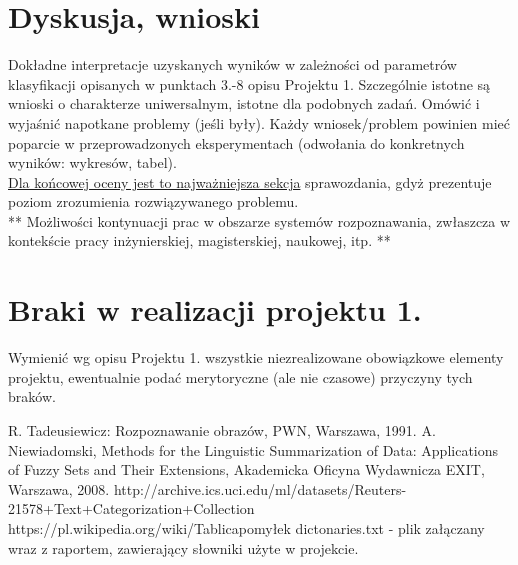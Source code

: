 \documentclass{classrep}
\begin{document}
\section{Dyskusja, wnioski}
Dokładne interpretacje uzyskanych wyników w zależności od parametrów klasyfikacji
opisanych w punktach 3.-8 opisu Projektu 1. 
Szczególnie istotne są wnioski o charakterze uniwersalnym, istotne dla podobnych zadań. 
Omówić i wyjaśnić napotkane problemy (jeśli były). Każdy wniosek/problem powinien mieć poparcie
w przeprowadzonych eksperymentach (odwołania do konkretnych wyników: wykresów,
tabel). \\
\underline{Dla końcowej oceny jest to najważniejsza sekcja} sprawozdania, gdyż prezentuje poziom
zrozumienia rozwiązywanego problemu.\\

** Możliwości kontynuacji prac w obszarze systemów rozpoznawania, zwłaszcza w kontekście pracy inżynierskiej,
magisterskiej, naukowej, itp. **\\



\section{Braki w realizacji projektu 1.}
Wymienić wg opisu Projektu 1. wszystkie niezrealizowane obowiązkowe elementy projektu, ewentualnie
podać merytoryczne (ale nie czasowe) przyczyny tych braków. 


\begin{thebibliography}{0}
 R. Tadeusiewicz: Rozpoznawanie obrazów, PWN, Warszawa, 1991.  
 A. Niewiadomski, Methods for the Linguistic Summarization of Data: Applications of Fuzzy Sets and Their Extensions, Akademicka Oficyna Wydawnicza EXIT, Warszawa, 2008.
 http://archive.ics.uci.edu/ml/datasets/Reuters-21578+Text+Categorization+Collection
 https://pl.wikipedia.org/wiki/Tablica\textunderscore pomyłek
 dictonaries.txt - plik załączany wraz z raportem, zawierający słowniki użyte w projekcie.
\end{thebibliography}

\end{document}
